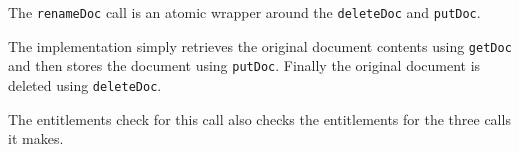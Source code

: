The \verb+renameDoc+ call is an atomic wrapper around the \verb+deleteDoc+ and \verb+putDoc+.

The implementation simply retrieves the original document contents using
\verb+getDoc+ and then stores the document using \verb+putDoc+. Finally
the original document is deleted using \verb+deleteDoc+.

The entitlements check for this call also checks the entitlements for the
three calls it makes.
